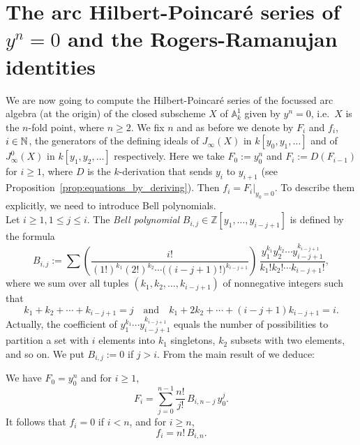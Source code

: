 \section{The arc Hilbert-Poincar\'{e} series of $y^n=0$ and the Rogers-Ramanujan identities}\label{sec:section_5}

We are now going to compute the Hilbert-Poincar\'{e} series of the focussed arc algebra (at the origin) of the closed subscheme $X$ of $\mathbb{A}^1_k$ given by $y^n=0$, i.e.\ $X$ is the $n$-fold point, where $n\geq 2$. We fix $n$ and as before we denote by $F_i$ and
$f_i$, $i\in \mathbb{N}$, the generators of the defining ideals of $J_{\infty}(X)$ in $k[y_0,y_1,\ldots]$ and of $J_\infty^0(X)$ in $k[y_1,y_2,\ldots]$ respectively. Here we take $F_0:=y_0^n$ and $F_i:=D(F_{i-1})$ for $i\geq 1$, where $D$ is the $k$-derivation that sends $y_i$ to $y_{i+1}$ (see Proposition~\ref{prop:equations_by_deriving}). Then $f_i = F_i|_{y_0=0}$. To describe them explicitly, we need to introduce Bell polynomials. \\

Let $i\geq 1, 1\leq j\leq i$. The \textit{Bell polynomial} $B_{i,j}\in \mathbb{Z}[y_1,\ldots , y_{i-j+1}]$ is defined by the formula
\[  B_{i,j} := \sum \left(\frac{i!}{(1!)^{k_1}(2!)^{k_2}\cdots \bigl((i-j+1)!\bigr)^{k_{i-j+1}}}\right)\, \frac{y_1^{k_1}y_2^{k_2}\cdots y_{i-j+1}^{k_{i-j+1}}}{k_1!k_2!\cdots k_{i-j+1}!},    \]   
where we sum over all tuples $(k_1,k_2, \ldots , k_{i-j+1})$ of nonnegative integers such that 
\[ k_1 + k_2+ \cdots + k_{i-j+1} = j \quad \text{and} \quad k_1 + 2k_2 + \cdots + (i-j+1)k_{i-j+1} = i.  \]
Actually, the coefficient of $y_1^{k_1}\cdots y_{i-j+1}^{k_{i-j+1}}$ equals the number of possibilities to partition a set with $i$ elements into $k_1$ singletons, $k_2$ subsets with two elements, and so on. We put $B_{i,j}:=0$ if $j>i$. 
From the main result of \cite{bruschek_JetAndBell} we deduce:

\begin{Prop}\label{prop:equations_are_bell_polynomials}
We have $F_0 = y_0^n$ and for $i\geq 1$,
\[ F_i  =  \sum_{j=0}^{n-1} \frac{n!}{j!}\, B_{i,n-j}\, y_0^{j}.  \]
It follows that $f_i = 0$ if $i<n$, and for $i\geq n$,
\[f_i  =  n!\, B_{i,n}.\]
\end{Prop}

